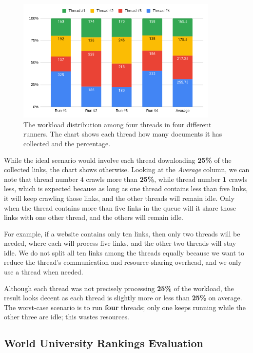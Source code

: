 {\begin{figure}[H]	
     \centering
     \includegraphics[width=10cm]{figures/threads_share.png}
  \captionsetup{justification=centering,margin=1cm}

     \caption{The workload distribution among four threads in four different runners. The chart shows each thread how many documents it has collected and the percentage.}
     \label{fig:threads-share}
\end{figure}

While the ideal scenario would involve each thread downloading \textbf{25\%} of the collected links, the chart shows otherwise. Looking at the \textit{Average} column, we can note that thread number \textbf{$4$} crawls more than \textbf{25\%}, while thread number \textbf{1} crawls less, which is expected because as long as one thread contains less than five links, it will keep crawling those links, and the other threads will remain idle. Only when the thread contains more than five links in the queue will it share those links with one other thread, and the others will remain idle. 

For example, if a website contains only ten links, then only two threads will be needed, where each will process five links, and the other two threads will stay idle. We do not split all ten links among the threads equally because we want to reduce the thread's communication and resource-sharing overhead, and we only use a thread when needed. 

Although each thread was not precisely processing \textbf{25\%} of the workload, the result looks decent as each thread is slightly more or less than \textbf{25\%} on average. The worst-case scenario is to run \textbf{four} threads; only one keeps running while the other three are idle; this wastes resources. 

\subsection*{World University Rankings Evaluation}\label{sec:uni-ranking}

}
